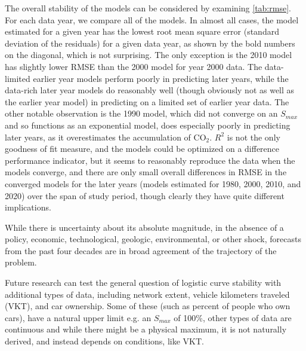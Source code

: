 \documentclass{article}
\begin{document}
The overall stability of the models can be considered by examining \autoref{tab:rmse}. For each data year, we compare all of the models. In almost all cases, the model estimated for a given year has the lowest root mean square error (standard deviation of the residuals) for a given data year, as shown by the bold numbers on the diagonal, which is not surprising. The only exception is the 2010 model has slightly lower RMSE than the 2000 model for year 2000 data. The data-limited earlier year models perform poorly in predicting later years, while the data-rich later year models do reasonably well (though obviously not as well as the earlier year model) in predicting on a limited set of earlier year data. The other notable observation is the 1990 model, which did not converge on an $S_{max}$ and so functions as an exponential model, does especially poorly in predicting later years, as it overestimates the accumulation of $\mathrm{CO_{2}}$. $R^2$ is not the only goodness of fit measure, and the models could be optimized on a difference performance indicator, but it seems to reasonably reproduce the data when the models converge, and there are only small overall differences in RMSE in the converged models for the later years (models estimated for 1980, 2000, 2010, and 2020) over the span of study period, though clearly they have quite different implications.

While there is uncertainty about its absolute magnitude, in the absence of a policy, economic, technological, geologic, environmental, or other shock, forecasts from the past four decades are in broad agreement of the trajectory of the problem. 

Future research can test the general question of logistic curve stability with additional types of data, including network extent, vehicle kilometers traveled (VKT), and car ownership. Some of these (such as percent of people who own cars), have a natural upper limit e.g. an $S_{max}$ of 100\%, other types of data are continuous and while there might be a physical maximum, it is not naturally derived, and instead depends on conditions, like VKT.

\end{document}
